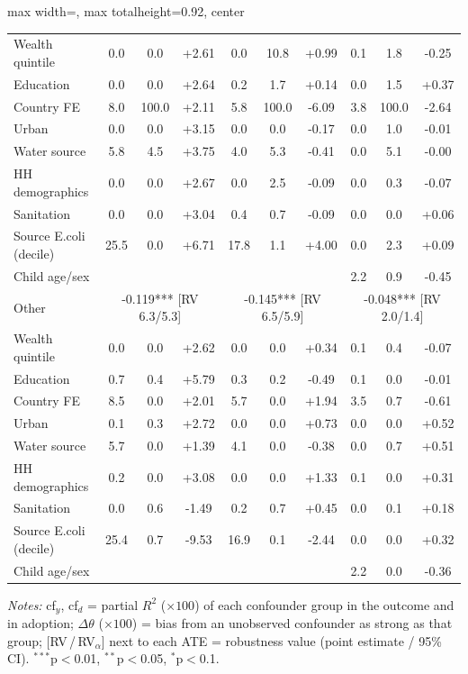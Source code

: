 \begin{landscape}
\begin{table}[htbp]
\begin{adjustbox}{max width=\linewidth, max totalheight=0.92\textheight, center}
\begin{tabular}{l|ccc|ccc|ccc}
\quad Wealth quintile & 0.0 & 0.0 & +2.61 & 0.0 & 10.8 & +0.99 & 0.1 & 1.8 & -0.25 \\
\quad Education & 0.0 & 0.0 & +2.64 & 0.2 & 1.7 & +0.14 & 0.0 & 1.5 & +0.37 \\
\quad Country FE & 8.0 & 100.0 & +2.11 & 5.8 & 100.0 & -6.09 & 3.8 & 100.0 & -2.64 \\
\quad Urban & 0.0 & 0.0 & +3.15 & 0.0 & 0.0 & -0.17 & 0.0 & 1.0 & -0.01 \\
\quad Water source & 5.8 & 4.5 & +3.75 & 4.0 & 5.3 & -0.41 & 0.0 & 5.1 & -0.00 \\
\quad HH demographics & 0.0 & 0.0 & +2.67 & 0.0 & 2.5 & -0.09 & 0.0 & 0.3 & -0.07 \\
\quad Sanitation & 0.0 & 0.0 & +3.04 & 0.4 & 0.7 & -0.09 & 0.0 & 0.0 & +0.06 \\
\quad Source E.coli (decile) & 25.5 & 0.0 & +6.71 & 17.8 & 1.1 & +4.00 & 0.0 & 2.3 & +0.09 \\
\quad Child age/sex &  &  &  &  &  &  & 2.2 & 0.9 & -0.45 \\
\midrule
Other & \multicolumn{3}{c|}{-0.119*** {\scriptsize[RV 6.3/5.3]}} & \multicolumn{3}{c|}{-0.145*** {\scriptsize[RV 6.5/5.9]}} & \multicolumn{3}{c}{-0.048*** {\scriptsize[RV 2.0/1.4]}} \\
\quad Wealth quintile & 0.0 & 0.0 & +2.62 & 0.0 & 0.0 & +0.34 & 0.1 & 0.4 & -0.07 \\
\quad Education & 0.7 & 0.4 & +5.79 & 0.3 & 0.2 & -0.49 & 0.1 & 0.0 & -0.01 \\
\quad Country FE & 8.5 & 0.0 & +2.01 & 5.7 & 0.0 & +1.94 & 3.5 & 0.7 & -0.61 \\
\quad Urban & 0.1 & 0.3 & +2.72 & 0.0 & 0.0 & +0.73 & 0.0 & 0.0 & +0.52 \\
\quad Water source & 5.7 & 0.0 & +1.39 & 4.1 & 0.0 & -0.38 & 0.0 & 0.7 & +0.51 \\
\quad HH demographics & 0.2 & 0.0 & +3.08 & 0.0 & 0.0 & +1.33 & 0.1 & 0.0 & +0.31 \\
\quad Sanitation & 0.0 & 0.6 & -1.49 & 0.2 & 0.7 & +0.45 & 0.0 & 0.1 & +0.18 \\
\quad Source E.coli (decile) & 25.4 & 0.7 & -9.53 & 16.9 & 0.1 & -2.44 & 0.0 & 0.0 & +0.32 \\
\quad Child age/sex &  &  &  &  &  &  & 2.2 & 0.0 & -0.36 \\
\bottomrule
\end{tabular}
\end{adjustbox}
\par\vspace{3pt}
\begin{minipage}{\linewidth}\footnotesize \textit{Notes:} cf$_y$, cf$_d$ = partial $R^2$ ($\times100$) of each confounder group in the outcome and in adoption; $\Delta\theta$ ($\times100$) = bias from an unobserved confounder as strong as that group; [RV\,/\,RV$_\alpha$] next to each ATE = robustness value (point estimate / 95\% CI). $^{***}$p$<$0.01, $^{**}$p$<$0.05, $^{*}$p$<$0.1.\end{minipage}
\end{table}
\end{landscape}